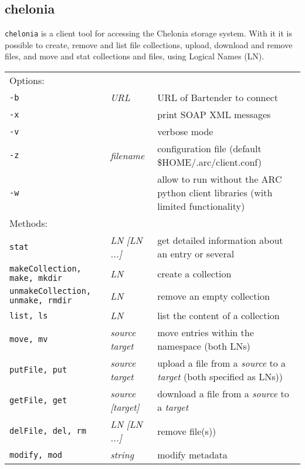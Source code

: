 \subsection{chelonia}\label{sec:chelonia}

\texttt{chelonia} is a client tool for
accessing the Chelonia storage system. With it it is possible to
create, remove and list file collections, upload, download and remove files,
and move and stat collections and files, using Logical Names (LN).
\hspace*{0.5cm}
\begin{shaded}
\end{shaded}
\begin{longtable}{llp{8cm}}
   Options:&&\\
   \texttt{-b} & \textit{URL} & URL of Bartender to connect\\
   \texttt{-x} && print SOAP XML messages\\
   \texttt{-v} && verbose mode\\
   \texttt{-z}&\textit{filename}& configuration file (default {\$}HOME/.arc/client.conf)\\
   \texttt{-w} && allow to run without the ARC python client libraries (with limited functionality)\\
   Methods:&&\\
   \texttt{stat} &\textit{LN [LN ...]}& get detailed information about an entry or several\\
   \texttt{makeCollection, make, mkdir} &\textit{LN}& create a collection\\
   \texttt{unmakeCollection, unmake, rmdir} &\textit{LN}& remove an empty collection\\
   \texttt{list, ls} &\textit{LN}& list the content of a collection\\
   \texttt{move, mv} &\textit{source target}& move entries within the namespace (both LNs)\\
   \texttt{putFile, put} &\textit{source target}& upload a file from a \textit{source} to a \textit{target} (both specified as LNs))\\
   \texttt{getFile, get} &\textit{source [target]}& download a file from a \textit{source} to a \textit{target}\\
   \texttt{delFile, del, rm} &\textit{LN [LN ...]}& remove file(s))\\
   \texttt{modify, mod} &\textit{string}& modify metadata\\

\end{longtable}
